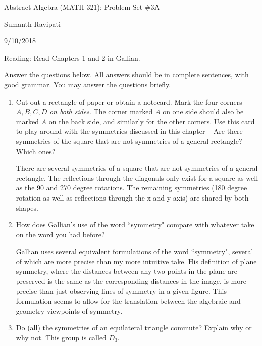 \documentclass{article}
\begin{document}
%
\centerline{\Large Abstract Algebra (MATH 321): Problem Set \#3A}
\centerline{Sumanth Ravipati}
\centerline{9/10/2018}
\vspace{.25in}

Reading: Read Chapters 1 and 2 in Gallian.

Answer the questions below. All answers should be in complete sentences, with good grammar. You may answer the questions briefly.
\begin{enumerate}
\item Cut out a rectangle of paper or obtain a notecard. Mark the four corners $A, B, C, D$ {\em on both sides}. The corner marked $A$ on one side should also be marked $A$ on the back side, and similarly for the other corners. Use this card to play around with the symmetries discussed in this chapter -- Are there symmetries of the square that are not symmetries of a general rectangle? Which ones?

\begin{flushleft}
There are several symmetries of a square that are not symmetries of a general rectangle. The reflections through the diagonals only exist for a square as well as the 90 and 270 degree rotations. The remaining symmetries (180 degree rotation as well as reflections through the x and y axis) are shared by both shapes.
\end{flushleft}


\item  How does Gallian's use of the word ``symmetry" compare with
whatever take on the word you had before?

\begin{flushleft}
Gallian uses several equivalent formulations of the word ``symmetry", several of which are more precise than my more intuitive take. His definition of plane symmetry, where the distances between any two points in the plane are preserved is the same as the corresponding distances in the image, is more precise than just observing lines of symmetry in a given figure. This formulation seems to allow for the translation between the algebraic and geometry viewpoints of symmetry. 
\end{flushleft}

\item Do (all) the symmetries of an equilateral triangle commute? Explain why or why not. This group is called $D_3$.


\end{enumerate}
\end{document}

